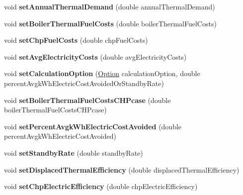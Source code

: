 \begin{DoxyCompactItemize}
\item 
\mbox{\label{class_c_h_p_aa7abaae6cf4d62059eff750498d70076}} 
void {\bfseries set\+Annual\+Thermal\+Demand} (double annual\+Thermal\+Demand)
\item 
\mbox{\label{class_c_h_p_a13c93cd6b6bba4d52b2f8fd10638724e}} 
void {\bfseries set\+Boiler\+Thermal\+Fuel\+Costs} (double boiler\+Thermal\+Fuel\+Costs)
\item 
\mbox{\label{class_c_h_p_a419c9eaf0ad6009bb3dd753e4b1dd63b}} 
void {\bfseries set\+Chp\+Fuel\+Costs} (double chp\+Fuel\+Costs)
\item 
\mbox{\label{class_c_h_p_ad953f7558bf3a38816e29d9ffaf6273c}} 
void {\bfseries set\+Avg\+Electricity\+Costs} (double avg\+Electricity\+Costs)
\item 
\mbox{\label{class_c_h_p_abfa71c23fa4b58c03c3337b57ba0d56d}} 
void {\bfseries set\+Calculation\+Option} (\hyperlink{class_c_h_p_ac82f530412021ace928a7e95c1295d06}{Option} calculation\+Option, double percent\+Avgk\+Wh\+Electric\+Cost\+Avoided\+Or\+Standby\+Rate)
\item 
\mbox{\label{class_c_h_p_a319f1e915035b2dface2dbad67c65017}} 
void {\bfseries set\+Boiler\+Thermal\+Fuel\+Costs\+C\+H\+Pcase} (double boiler\+Thermal\+Fuel\+Costs\+C\+H\+Pcase)
\item 
\mbox{\label{class_c_h_p_a002b9e405c3a1777b306430cd1bbbec3}} 
void {\bfseries set\+Percent\+Avgk\+Wh\+Electric\+Cost\+Avoided} (double percent\+Avgk\+Wh\+Electric\+Cost\+Avoided)
\item 
\mbox{\label{class_c_h_p_ac25d489d5d3e336f7286c0124f81d3c5}} 
void {\bfseries set\+Standby\+Rate} (double standby\+Rate)
\item 
\mbox{\label{class_c_h_p_a6f80ede27800dfdeb0493e0501823fde}} 
void {\bfseries set\+Displaced\+Thermal\+Efficiency} (double displaced\+Thermal\+Efficiency)
\item 
\mbox{\label{class_c_h_p_a63de982e8324e669ea8a6712a30a6ce4}} 
void {\bfseries set\+Chp\+Electric\+Efficiency} (double chp\+Electric\+Efficiency)

\end{DoxyCompactItemize}
